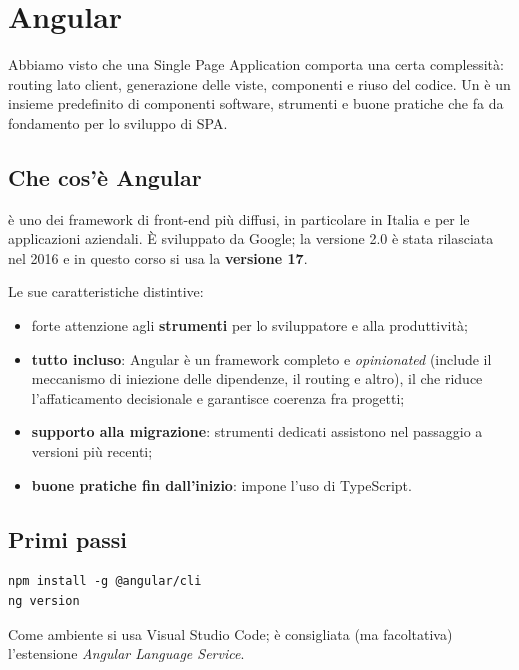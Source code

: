\chapter{Angular}

Abbiamo visto che una Single Page Application comporta una certa complessità:
routing lato client, generazione delle viste, componenti e riuso del codice. Un
 è un insieme predefinito di componenti software,
strumenti e buone pratiche che fa da fondamento per lo sviluppo di SPA.

\section{Che cos'è Angular}

 è uno dei framework di front-end più diffusi, in particolare in
Italia e per le applicazioni aziendali. È sviluppato da Google; la versione 2.0
è stata rilasciata nel 2016 e in questo corso si usa la \textbf{versione 17}.

Le sue caratteristiche distintive:

\begin{itemize}
  \item forte attenzione agli \textbf{strumenti} per lo sviluppatore e alla
        produttività;
  \item \textbf{tutto incluso}: Angular è un framework completo e
        \textit{opinionated} (include il meccanismo di iniezione delle
        dipendenze, il routing e altro), il che riduce l'affaticamento
        decisionale e garantisce coerenza fra progetti;
  \item \textbf{supporto alla migrazione}: strumenti dedicati assistono nel
        passaggio a versioni più recenti;
  \item \textbf{buone pratiche fin dall'inizio}: impone l'uso di TypeScript.
\end{itemize}

\section{Primi passi}

\begin{lstlisting}[style=shell]
npm install -g @angular/cli
ng version
\end{lstlisting}

Come ambiente si usa Visual Studio Code; è consigliata (ma facoltativa)
l'estensione \textit{Angular Language Service}.

